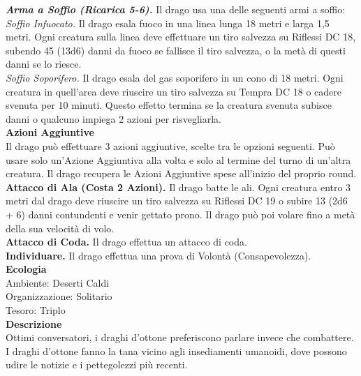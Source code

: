 \begin{multicols}{2}
\emph{\textbf{Arma a Soffio (Ricarica 5-6).}} Il drago usa una delle seguenti armi a soffio:\\
\emph{Soffio Infuocato.} Il drago esala fuoco in una linea lunga 18 metri e larga 1,5 metri. Ogni creatura sulla linea deve effettuare un tiro salvezza su Riflessi DC 18, subendo 45 (13d6) danni da fuoco se fallisce il tiro salvezza, o la metà di questi danni se lo riesce.\\
\emph{Soffio Soporifero.} Il drago esala del gas soporifero in un cono di 18 metri. Ogni creatura in quell'area deve riuscire un tiro salvezza su Tempra DC 18 o cadere svenuta per 10 minuti. Questo effetto termina se la creatura svenuta subisce danni o qualcuno impiega 2 azioni per risvegliarla.\\
\textbf{Azioni Aggiuntive}\\
Il drago può effettuare 3 azioni aggiuntive, scelte tra le opzioni seguenti. Può usare solo un'Azione Aggiuntiva alla volta e solo al termine del turno di un'altra creatura. Il drago recupera le Azioni Aggiuntive spese all'inizio del proprio round.\\
\textbf{Attacco di Ala (Costa 2 Azioni).} Il drago batte le ali. Ogni creatura entro 3 metri dal drago deve riuscire un tiro salvezza su Riflessi DC 19 o subire 13 (2d6 + 6) danni contundenti e venir gettato prono. Il drago può poi volare fino a metà della sua velocità di volo.\\
\textbf{Attacco di Coda.} Il drago effettua un attacco di coda.\\
\textbf{Individuare.} Il drago effettua una prova di Volontà (Consapevolezza).\\
\textbf{Ecologia}\\
Ambiente: Deserti Caldi\\
Organizzazione: Solitario\\
Tesoro: Triplo\\
\textbf{Descrizione}\\
Ottimi conversatori, i draghi d’ottone preferiscono parlare invece che combattere. I draghi d’ottone fanno la tana vicino agli insediamenti umanoidi, dove possono udire le notizie e i pettegolezzi più recenti.\\



\end{multicols}
